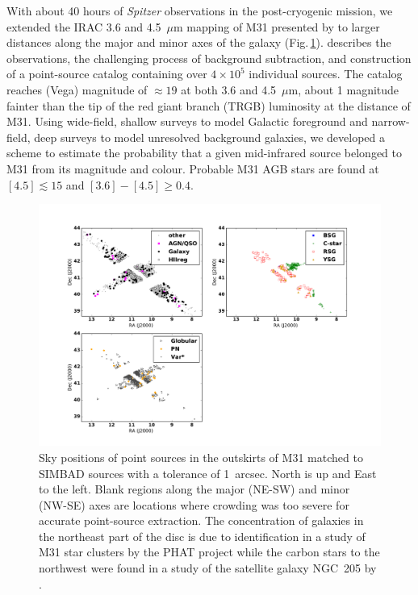 \documentclass{iau}
\begin{document}
With about 40 hours of {\it Spitzer} observations in the post-cryogenic mission, we extended the IRAC 3.6 and 4.5~$\mu$m
mapping of M31 presented by \cite[Barmby \etal\ (2006)]{barmby06} to larger distances along the major and minor
axes of the galaxy (Fig.\,\ref{fig1}). \cite[Rafiei Ravandi \etal\ (2016)]{rr16} describes the observations, the challenging process of background
subtraction, and construction of a point-source catalog containing over $4\times 10^5$ individual sources. The catalog reaches (Vega)
magnitude of $\approx 19$ at both 3.6 and 4.5~$\mu$m, about 1 magnitude fainter than the tip of the red giant branch (TRGB) luminosity
at the distance of M31. Using wide-field, shallow surveys to model Galactic foreground and narrow-field, deep surveys to model 
unresolved background galaxies, we developed a scheme to estimate the probability that 
a given mid-infrared source belonged to M31 from its magnitude and colour. Probable M31 AGB stars
are found  at $[4.5]\lesssim15$ and $[3.6]-[4.5] \geq 0.4$. 


\begin{figure}[t]
\begin{center}
 \includegraphics[width=\textwidth]{fig1_new} 
 \caption{Sky positions of point sources in the outskirts of M31 matched to SIMBAD sources with a tolerance of 1~arcsec. North is up and East to the left.
 Blank regions along the major (NE-SW) and minor (NW-SE) axes are locations where crowding was too severe for accurate point-source extraction.
The concentration of galaxies in the northeast part of the disc is due to identification in a study of M31 star clusters by the PHAT project 
\cite[(Johnson \etal\ 2012)]{johnson12} 
while the carbon stars to the northwest were found in a study of the satellite galaxy NGC~205 by \cite[Demers, Battinelli \& Letarte (2003)]{dbl03}.}
   \label{fig1}
\end{center}
\end{figure}
\end{document}
